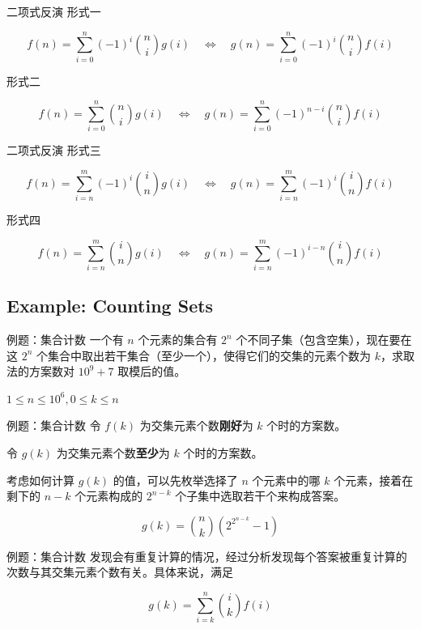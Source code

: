 \documentclass[12pt,aspectratio=169]{beamer}
\begin{document}
\begin{frame}[fragile]{二项式反演}
形式一

$$
f(n) = \sum_{i=0}^{n} (-1)^i {n \choose i} g(i)
\quad \Longleftrightarrow \quad
g(n) = \sum_{i=0}^{n} (-1)^i {n \choose i} f(i)
$$

形式二

$$
f(n) = \sum_{i=0}^{n} {n \choose i} g(i)
\quad \Longleftrightarrow \quad
g(n) = \sum_{i=0}^{n} (-1)^{n-i} {n \choose i} f(i)
$$
\end{frame}

\begin{frame}[fragile]{二项式反演}
形式三

$$
f(n) = \sum_{i=n}^{m} (-1)^i {i \choose n} g(i)
\quad \Longleftrightarrow \quad
g(n) = \sum_{i=n}^{m} (-1)^i {i \choose n} f(i)
$$

形式四

$$
f(n) = \sum_{i=n}^{m} {i \choose n} g(i)
\quad \Longleftrightarrow \quad
g(n) = \sum_{i=n}^{m} (-1)^{i-n} {i \choose n} f(i)
$$
\end{frame}

\subsection[例题：集合计数]{Example: Counting Sets}

\begin{frame}[fragile]{例题：集合计数}
一个有 $n$ 个元素的集合有 $2^n$ 个不同子集（包含空集），现在要在这 $2^n$ 个集合中取出若干集合（至少一个），使得它们的交集的元素个数为 $k$，求取法的方案数对 $10^9+7$ 取模后的值。

$1 \le n \le 10^6, 0 \le k \le n$
\end{frame}

\begin{frame}[fragile]{例题：集合计数}
令 $f(k)$ 为交集元素个数\textbf{刚好}为 $k$ 个时的方案数。

令 $g(k)$ 为交集元素个数\textbf{至少}为 $k$ 个时的方案数。

考虑如何计算 $g(k)$ 的值，可以先枚举选择了 $n$ 个元素中的哪 $k$ 个元素，接着在剩下的 $n-k$ 个元素构成的 $2^{n-k}$ 个子集中选取若干个来构成答案。

$$
g(k) = {n \choose k} \left(2^{2^{n-k}}-1\right)
$$
\end{frame}

\begin{frame}[fragile]{例题：集合计数}
发现会有重复计算的情况，经过分析发现每个答案被重复计算的次数与其交集元素个数有关。具体来说，满足

$$
g(k) = \sum_{i=k}^{n} {i \choose k} f(i)
$$
\end{frame}
\end{document}
